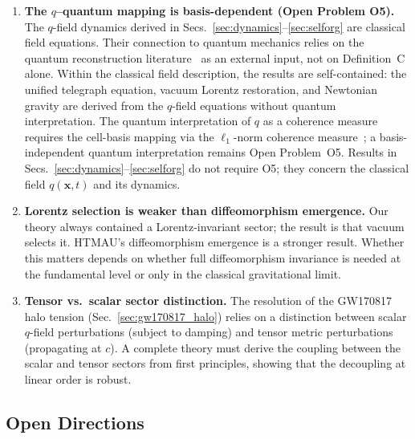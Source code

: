 \documentclass[aps,prd,twocolumn,showpacs,superscriptaddress,preprintnumbers]{revtex4-2}
\begin{document}
\begin{enumerate}
    \item \textbf{The $q$--quantum mapping is basis-dependent (Open Problem O5).}
    The $q$-field dynamics derived in Secs.~\ref{sec:dynamics}--\ref{sec:selforg} are classical field equations.
    Their connection to quantum mechanics relies on the quantum reconstruction literature~\cite{Zeilinger1999,Dakic2011,Chiribella2011,Masanes2011,Shaghaghi2023,Zilly:2026} as an external input, not on Definition~C alone.
    Within the classical field description, the results are self-contained: the unified telegraph equation, vacuum Lorentz restoration, and Newtonian gravity are derived from the $q$-field equations without quantum interpretation.
    The quantum interpretation of $q$ as a coherence measure requires the cell-basis mapping via the $\ell_1$-norm coherence measure~\cite{Baumgratz2014}; a basis-independent quantum interpretation remains Open Problem~O5.
    Results in Secs.~\ref{sec:dynamics}--\ref{sec:selforg} do not require O5; they concern the classical field $q(\mathbf{x},t)$ and its dynamics.

    \item \textbf{Lorentz selection is weaker than diffeomorphism emergence.} Our theory always contained a Lorentz-invariant sector; the result is that vacuum selects it. HTMAU's diffeomorphism emergence is a stronger result. Whether this matters depends on whether full diffeomorphism invariance is needed at the fundamental level or only in the classical gravitational limit.

    \item \textbf{Tensor vs.\ scalar sector distinction.} The resolution of the GW170817 halo tension (Sec.~\ref{sec:gw170817_halo}) relies on a distinction between scalar $q$-field perturbations (subject to damping) and tensor metric perturbations (propagating at $c$). A complete theory must derive the coupling between the scalar and tensor sectors from first principles, showing that the decoupling at linear order is robust.
\end{enumerate}

\subsection{Open Directions}
\end{document}
